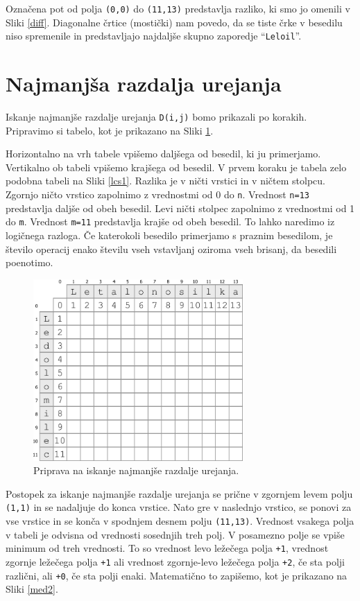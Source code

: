 \documentclass[a4paper, 12pt, twoside]{book}
\begin{document}
Označena pot od polja {\tt (0,0)} do {\tt (11,13)} predstavlja razliko, ki smo jo omenili v Sliki \ref{diff}. Diagonalne črtice (mostički) nam povedo, da se tiste črke v besedilu niso spremenile in predstavljajo najdaljše skupno zaporedje “{\tt Leloil}”.

\section{Najmanjša razdalja urejanja}
\label{sec:med}

Iskanje najmanjše razdalje urejanja {\tt D(i,j)} bomo prikazali po korakih. Pripravimo si tabelo, kot je prikazano na Sliki \ref{med1}.

Horizontalno na vrh tabele vpišemo daljšega od besedil, ki ju primerjamo. Vertikalno ob tabeli vpišemo krajšega od besedil. V prvem koraku je tabela zelo podobna tabeli na Sliki \ref{lcs1}. Razlika je v ničti vrstici in v ničtem stolpcu. Zgornjo ničto vrstico zapolnimo z vrednostmi od 0 do {\tt n}. Vrednost {\tt n=13} predstavlja daljše od obeh besedil. Levi ničti stolpec zapolnimo z vrednostmi od 1 do {\tt m}. Vrednost {\tt m=11} predstavlja krajše od obeh besedil. To lahko naredimo iz logičnega razloga. Če katerokoli besedilo primerjamo s praznim besedilom, je število operacij enako številu vseh vstavljanj oziroma vseh brisanj, da besedili poenotimo.

\begin{figure}[placement h]
\begin{center}
\includegraphics[width=8cm]{img/med1.pdf}
\end{center}
\caption{Priprava na iskanje najmanjše razdalje urejanja.}
\label{med1}
\end{figure}

Postopek za iskanje najmanjše razdalje urejanja se prične v zgornjem levem polju {\tt (1,1)} in se nadaljuje do konca vrstice. Nato gre v naslednjo vrstico, se ponovi za vse vrstice in se konča v spodnjem desnem polju {\tt (11,13)}. Vrednost vsakega polja v tabeli je odvisna od vrednosti sosednjih treh polj. V posamezno polje se vpiše minimum od treh vrednosti. To so vrednost levo ležečega polja {\tt +1}, vrednost zgornje ležečega polja {\tt +1} ali vrednost zgornje-levo ležečega polja {\tt +2}, če sta polji različni, ali {\tt +0}, če sta polji enaki. Matematično to zapišemo, kot je prikazano na Sliki \ref{med2}.
\end{document}
